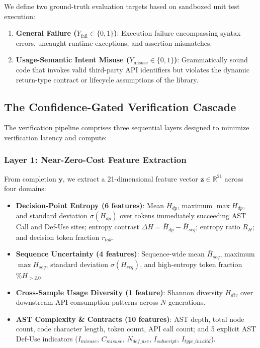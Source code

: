 We define two ground-truth evaluation targets based on sandboxed unit test execution:
\begin{enumerate}
    \item \textbf{General Failure ($Y_{\text{fail}} \in \{0, 1\}$)}: Execution failure encompassing syntax errors, uncaught runtime exceptions, and assertion mismatches.
    \item \textbf{Usage-Semantic Intent Misuse ($Y_{\text{misuse}} \in \{0, 1\}$)}: Grammatically sound code that invokes valid third-party API identifiers but violates the dynamic return-type contract or lifecycle assumptions of the library.
\end{enumerate}

\subsection{The Confidence-Gated Verification Cascade}
The verification pipeline comprises three sequential layers designed to minimize verification latency and compute:

\subsubsection{Layer 1: Near-Zero-Cost Feature Extraction}
From completion $\mathbf{y}$, we extract a 21-dimensional feature vector $\mathbf{z} \in \mathbb{R}^{21}$ across four domains:
\begin{itemize}
    \item \textbf{Decision-Point Entropy (6 features)}: Mean $\bar{H}_{dp}$, maximum $\max H_{dp}$, and standard deviation $\sigma(H_{dp})$ over tokens immediately succeeding AST Call and Def-Use sites; entropy contrast $\Delta H = \bar{H}_{dp} - \bar{H}_{seq}$; entropy ratio $R_H$; and decision token fraction $r_{tok}$.
    \item \textbf{Sequence Uncertainty (4 features)}: Sequence-wide mean $\bar{H}_{seq}$, maximum $\max H_{seq}$, standard deviation $\sigma(H_{seq})$, and high-entropy token fraction $\%H_{>2.0}$.
    \item \textbf{Cross-Sample Usage Diversity (1 feature)}: Shannon diversity $H_{div}$ over downstream API consumption patterns across $N$ generations.
    \item \textbf{AST Complexity \& Contracts (10 features)}: AST depth, total node count, code character length, token count, API call count; and 5 explicit AST Def-Use indicators ($I_{misuse}$, $C_{misuse}$, $N_{def\_use}$, $I_{subscript}$, $I_{type\_invalid}$).
\end{itemize}


